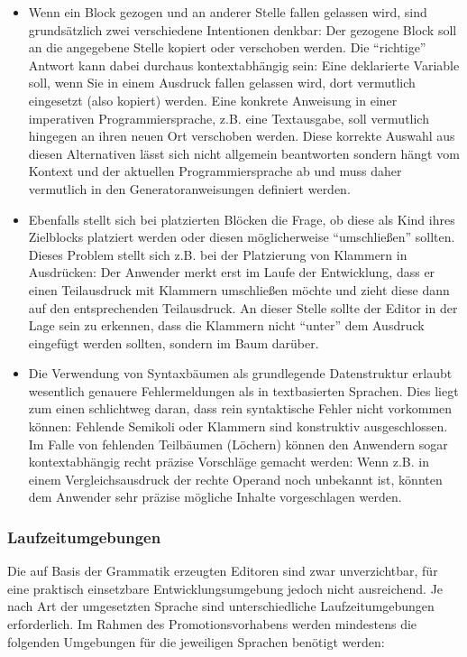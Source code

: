 \documentclass[paper=a4,fontsize=12pt,parskip=half]{scrartcl}
\begin{document}
\begin{itemize}
\item Wenn ein Block gezogen und an anderer Stelle fallen gelassen wird, sind grundsätzlich zwei verschiedene Intentionen denkbar: Der gezogene Block soll an die angegebene Stelle kopiert oder verschoben werden. Die \enquote{richtige} Antwort kann dabei durchaus kontextabhängig sein: Eine deklarierte Variable soll, wenn Sie in einem Ausdruck fallen gelassen wird, dort vermutlich eingesetzt (also kopiert) werden. Eine konkrete Anweisung in einer imperativen Programmiersprache, z.B. eine Textausgabe, soll vermutlich hingegen an ihren neuen Ort verschoben werden. Diese korrekte Auswahl aus diesen Alternativen lässt sich nicht allgemein beantworten sondern hängt vom Kontext und der aktuellen Programmiersprache ab und muss daher vermutlich in den Generatoranweisungen definiert werden.
\item Ebenfalls stellt sich bei platzierten Blöcken die Frage, ob diese als Kind ihres Zielblocks platziert werden oder diesen möglicherweise \enquote{umschließen} sollten. Dieses Problem stellt sich z.B. bei der Platzierung von Klammern in Ausdrücken: Der Anwender merkt erst im Laufe der Entwicklung, dass er einen Teilausdruck mit Klammern umschließen möchte und zieht diese dann auf den entsprechenden Teilausdruck. An dieser Stelle sollte der Editor in der Lage sein zu erkennen, dass die Klammern nicht \enquote{unter} dem Ausdruck eingefügt werden sollten, sondern im Baum darüber.
\item Die Verwendung von Syntaxbäumen als grundlegende Datenstruktur erlaubt wesentlich genauere Fehlermeldungen als in textbasierten Sprachen. Dies liegt zum einen schlichtweg daran, dass rein syntaktische Fehler nicht vorkommen können: Fehlende Semikoli oder Klammern sind konstruktiv ausgeschlossen. Im Falle von fehlenden Teilbäumen (Löchern) können den Anwendern sogar kontextabhängig recht präzise Vorschläge gemacht werden: Wenn z.B. in einem Vergleichsausdruck der rechte Operand noch unbekannt ist, könnten dem Anwender sehr präzise mögliche Inhalte vorgeschlagen werden.
\end{itemize}

\subsubsection{Laufzeitumgebungen}

Die auf Basis der Grammatik erzeugten Editoren sind zwar unverzichtbar, für eine praktisch einsetzbare Entwicklungsumgebung jedoch nicht ausreichend. Je nach Art der umgesetzten Sprache sind unterschiedliche Laufzeitumgebungen erforderlich. Im Rahmen des Promotionsvorhabens werden mindestens die folgenden Umgebungen für die jeweiligen Sprachen benötigt werden:
\end{document}

